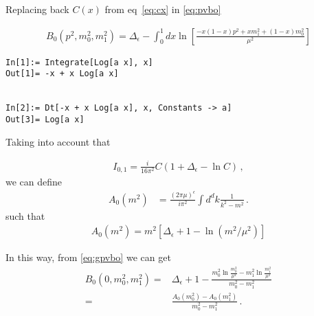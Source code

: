 Replacing back $C(x)$ from eq~\eqref{eq:cx} in \eqref{eq:pvbo}

\begin{align}
  \label{eq:gpvbo}
  B_{0}\left(p^{2}, m_{0}^{2}, m_{1}^{2}\right)=\Delta_{\epsilon}-\int_{0}^{1} d x \ln \left[\frac{-x(1-x) p^{2}+x m_{1}^{2}+(1-x) m_{0}^{2}}{\mu^{2}}\right]
\end{align}

\begin{verbatim}
In[1]:= Integrate[Log[a x], x]
Out[1]= -x + x Log[a x]


In[2]:= Dt[-x + x Log[a x], x, Constants -> a]
Out[3]= Log[a x]
\end{verbatim}

Taking into account that

\begin{align}
  \label{eq:I01}
  I_{0,1}=\frac{i}{16 \pi^{2}} C\left(1+\Delta_{\epsilon}-\ln C\right)\,,
\end{align}
we can define
\begin{align}
   A_{0}\left(m^{2}\right) &=\frac{(2 \pi \mu)^{\epsilon}}{i \pi^{2}} \int d^{d} k \frac{1}{k^{2}-m^{2}}\,.
\end{align}
such that
\begin{align*}
  A_0\left(m^2\right)=m^2 \left[ \Delta_{\epsilon}+1-\ln \left( m^2/\mu^2 \right) \right]
\end{align*}

In this way, from \eqref{eq:gpvbo} we can get
\begin{align}
  B_{0}\left(0, m_{0}^{2}, m_{1}^{2}\right)=&\Delta_{\epsilon}+1-\frac{m_{0}^{2} \ln \frac{m_{0}^{2}}{\mu^{2}}-m_{1}^{2} \ln \frac{m_{1}^{2}}{\mu^{2}}}{m_{0}^{2}-m_{1}^{2}} \nonumber\\
 =&\frac{A_{0}\left(m_{0}^{2}\right)-A_{0}\left(m_{1}^{2}\right)}{m_{0}^{2}-m_{1}^{2}}\,.
\end{align}


